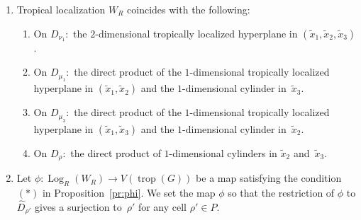 \documentclass[10pt,a4paper]{amsart}
\numberwithin{equation}{section}
\begin{document}
\begin{enumerate}\itemsep=0pt
\item Tropical localization $W_R$ coincides with the following:
 \begin{enumerate}\itemsep=0pt
 \item On $D_{\nu_1} \colon$ the $2$-dimensional tropically localized hyperplane in $(\tilde{x}_1, \tilde{x}_2, \tilde{x}_3)$.
 \item On $D_{\mu_1} \colon$ the direct product of the $1$-dimensional tropically localized hyperplane in $(\tilde{x}_1, \tilde{x}_2)$ and the $1$-dimensional cylinder in~$\tilde{x}_3$.
 \item On $D_{\mu_3} \colon$ the direct product of the $1$-dimensional tropically localized hyperplane in $(\tilde{x}_1, \tilde{x}_3)$ and the $1$-dimensional cylinder in~$\tilde{x}_2$.
 \item On $D_{\rho} \colon$ the direct product of $1$-dimensional cylinders in $\tilde{x}_2$ and~$\tilde{x}_3$.
 \end{enumerate}

\item Let $\phi \colon \operatorname{Log}_R(W_R) \to V(\operatorname{trop}(G))$ be a map satisfying the condition $(\ast)$ in Proposition~\ref{pr:phi}.
We set the map $\phi$ so that the restriction of $\phi$ to $\widehat{D}_{\rho'}$ gives a surjection to~$\rho'$ for any cell $\rho' \in P$.


\end{enumerate}
\end{document}
